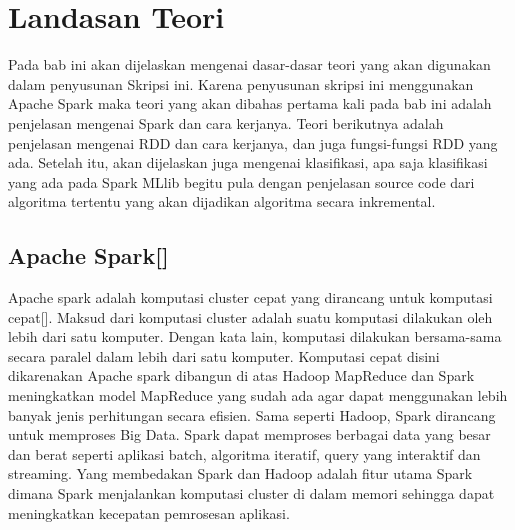 \chapter{Landasan Teori}
\label{chap:teori}

Pada bab ini akan dijelaskan mengenai dasar-dasar teori yang akan digunakan dalam penyusunan Skripsi ini. Karena penyusunan skripsi ini menggunakan Apache Spark maka teori yang akan dibahas pertama kali pada bab ini adalah penjelasan mengenai Spark dan cara kerjanya. Teori berikutnya adalah penjelasan mengenai RDD dan cara kerjanya, dan juga fungsi-fungsi RDD yang ada. Setelah itu, akan dijelaskan juga mengenai klasifikasi, apa saja klasifikasi yang ada pada Spark MLlib begitu pula dengan penjelasan source code dari algoritma tertentu yang akan dijadikan algoritma secara inkremental. 

\section{Apache Spark[]}
\label{sec:spark} 
Apache spark adalah komputasi cluster cepat yang dirancang untuk komputasi cepat[]. Maksud dari komputasi cluster adalah suatu komputasi dilakukan oleh lebih dari satu komputer. Dengan kata lain, komputasi dilakukan bersama-sama secara paralel dalam lebih dari satu komputer. Komputasi cepat disini dikarenakan Apache spark dibangun di atas Hadoop MapReduce dan Spark meningkatkan model MapReduce yang sudah ada agar dapat menggunakan lebih banyak jenis perhitungan secara efisien. Sama seperti Hadoop, Spark dirancang untuk memproses Big Data. Spark dapat memproses berbagai data yang besar dan berat seperti aplikasi batch, algoritma iteratif, query yang interaktif dan streaming. Yang membedakan Spark dan Hadoop adalah fitur utama Spark dimana Spark menjalankan komputasi cluster di dalam memori sehingga dapat meningkatkan kecepatan pemrosesan aplikasi.

